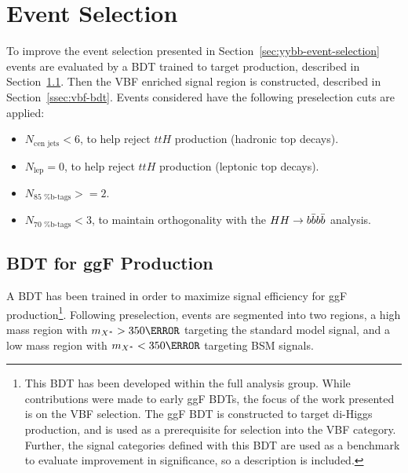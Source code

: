 \section{Event Selection}\label{ssec:vbf-event-selection}

To improve the event selection presented in Section~\ref{sec:yybb-event-selection} events are evaluated by a \gls{BDT} trained to target \hh production, described in Section~\ref{ssec:ggf-bdt}. Then the \gls{VBF} enriched signal region is constructed, described in Section~\ref{ssec:vbf-bdt}. Events considered have the following preselection cuts are applied:

\begin{itemize}
	\item $N_{\text{cen jets}} < 6$, to help reject $ttH$ production (hadronic top decays).
	\item $N_{\text{lep}} = 0$, to help reject $ttH$ production (leptonic top decays).
	\item $N_{\text{85 \% b-tags}} >= 2$.
	\item $N_{\text{70 \% b-tags}} < 3$, to maintain orthogonality with the $HH \rightarrow b\bar{b}b\bar{b}$ analysis.
\end{itemize}



\subsection{BDT for ggF Production}\label{ssec:ggf-bdt}
A \gls{BDT} has been trained in order to maximize signal efficiency for ggF \HH production\footnote{This \gls{BDT} has been developed within the full \hhyybb analysis group. While contributions were made to early \gls{ggF} BDTs, the focus of the work presented is on the \gls{VBF} selection. The \gls{ggF} \gls{BDT} is constructed to target di-Higgs production, and is used as a prerequisite for selection into the \gls{VBF} category. Further, the signal categories defined with this \gls{BDT} are used as a benchmark to evaluate improvement in significance, so a description is included.}. Following preselection, events are segmented into two regions, a high mass region with ${m_{X^{*}} > \unit{350}{\GeV}}$ targeting the standard model signal, and a low mass region with ${m_{X^{*}} < \unit{350}{\GeV}}$ targeting \gls{BSM} signals. 


